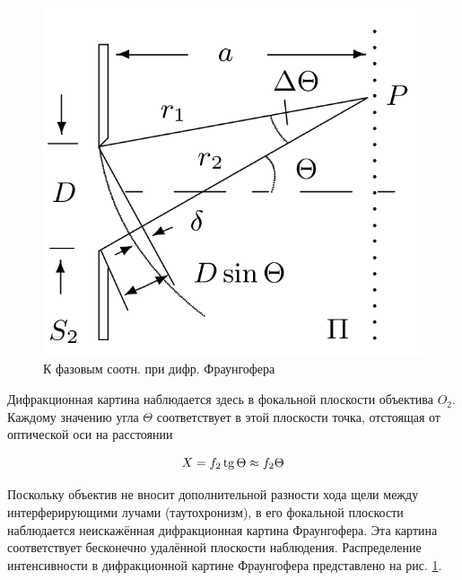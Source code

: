\documentclass[a5paper,10pt, twoside]{article} %
\begin{document}
	\begin{figure} %
		\label{img:phase}
		\includegraphics[width=\linewidth]{phase.png}
		\caption{К фазовым соотн. при дифр. Фраунгофера}
	\end{figure}

	Дифракционная картина наблюдается здесь в фокальной плоскости объектива $O_2$. Каждому значению
	угла $\Theta$ соответствует в этой плоскости точка, отстоящая от оптической оси на расстоянии

	\begin{equation}\label{eq:dist}
		X = f_2 \mathop{\mathrm{tg}}\nolimits \Theta \approx f_2 \Theta
	\end{equation}

	Поскольку объектив не вносит дополнительной разности хода щели между интерферирующими лучами
	(таутохронизм), в его фокальной плоскости наблюдается неискажённая дифракционная картина 
	Фраунгофера. Эта картина соответствует бесконечно удалённой плоскости наблюдения. Распределение
	интенсивности в дифракционной картине Фраунгофера представлено на рис. \ref{img:phase}.
\end{document}
